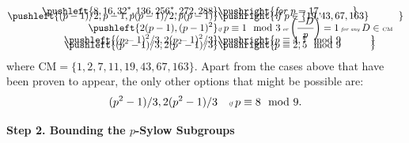 \begin{frame}[plain,c]
\begin{thm}
\begin{align}
	\pushleft{8, 16, 32^*, 136, 256^*, 272, 288} & \pushright{\text{\itshape for } p= 17,\quad\quad\quad} \label{9} \\[-1em]
	\pushleft{(p - 1)/2, p - 1, p(p - 1)/2, p(p - 1)} & \pushright{\text{\itshape if } p \in \{ 19, 43, 67, 163 \}\quad\quad\quad} \label{10} \\[-1em]
	\pushleft{2(p - 1), (p - 1)^2} & {\small \text{\tiny\itshape if } p \equiv 1 \mod 3 \text{\tiny\itshape\ or } \genfrac(){}{0}{-D}{p}= 1 \text{\tiny\itshape\ for any } D \in \text{\tiny CM} }\label{11} \\[-1em]
	\pushleft{(p - 1)^2/3, 2(p - 1)^2/3} &  \pushright{p \equiv 4, 7 \mod 9 \quad\quad\quad} \label{12} \\[-1em]
	\pushleft{(p^2 - 1)/3, 2(p^2 - 1)/3} &  \pushright{p \equiv 2, 5 \mod 9 \quad\quad\quad} \label{13}
	\end{align}
where $\text{CM}= \{ 1, 2, 7, 11, 19, 43, 67, 163 \}$. Apart from the cases above that have been proven to appear, the only other options that might be possible are:
	\begin{equation} \label{14}
	(p^2 - 1)/3, 2(p^2 - 1)/3 \quad \text{\tiny\itshape if } p \equiv 8 \mod 9.
	\end{equation}
\end{thm}
\end{frame}





\begin{frame}[plain]
\vfill
\begin{center} {\bfseries \Large \textcolor{UniOrange}{Step 2. Bounding the $p$-Sylow Subgroups}} \end{center}
\vfill 
\end{frame}





